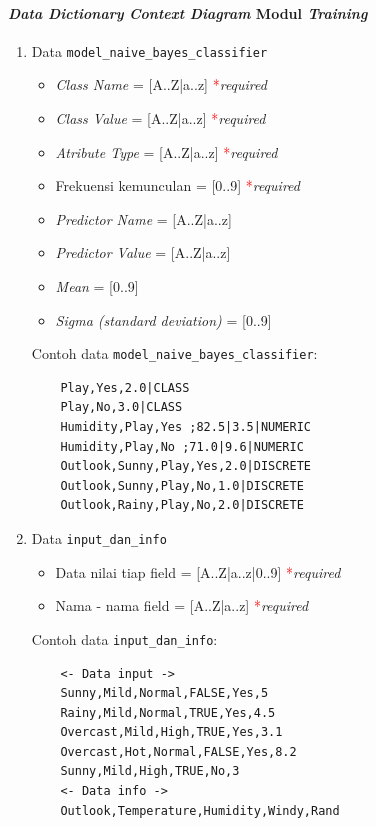 \paragraph{\textit{Data Dictionary} \textit{Context Diagram} Modul \textit{Training}}
\begin{enumerate}
	\item{Data \verb|model_naive_bayes_classifier|}
	\begin{itemize}
		\item \textit{Class Name} = [A..Z|a..z] \textcolor{red}{*}\textit{required}
		\item \textit{Class Value} = [A..Z|a..z] \textcolor{red}{*}\textit{required}
		\item \textit{Atribute Type} = [A..Z|a..z] \textcolor{red}{*}\textit{required}
		\item Frekuensi kemunculan = [0..9] \textcolor{red}{*}\textit{required}
		\item \textit{Predictor Name} = [A..Z|a..z]
		\item \textit{Predictor Value} = [A..Z|a..z]
		\item \textit{Mean} = [0..9]
		\item \textit{Sigma (standard deviation)} = [0..9]
	\end{itemize}
	Contoh data \verb|model_naive_bayes_classifier|:
	\begin{lstlisting}
	Play,Yes,2.0|CLASS
	Play,No,3.0|CLASS
	Humidity,Play,Yes ;82.5|3.5|NUMERIC
	Humidity,Play,No ;71.0|9.6|NUMERIC
	Outlook,Sunny,Play,Yes,2.0|DISCRETE
	Outlook,Sunny,Play,No,1.0|DISCRETE
	Outlook,Rainy,Play,No,2.0|DISCRETE
	\end{lstlisting}
		
	\item{Data \verb|input_dan_info|}
	\begin{itemize}
		\item Data nilai tiap field = [A..Z|a..z|0..9] \textcolor{red}{*}\textit{required}
		\item Nama - nama field = [A..Z|a..z] \textcolor{red}{*}\textit{required}
	\end{itemize}
	Contoh data \verb|input_dan_info|:
	\begin{lstlisting}
	<- Data input ->	
	Sunny,Mild,Normal,FALSE,Yes,5
	Rainy,Mild,Normal,TRUE,Yes,4.5
	Overcast,Mild,High,TRUE,Yes,3.1
	Overcast,Hot,Normal,FALSE,Yes,8.2
	Sunny,Mild,High,TRUE,No,3
	<- Data info ->
	Outlook,Temperature,Humidity,Windy,Rand
	\end{lstlisting}
\end{enumerate}


